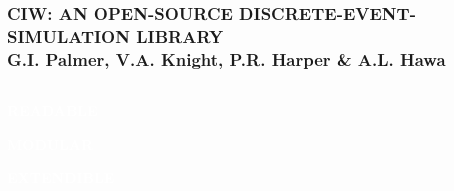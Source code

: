 \documentclass{beamer}
\begin{document}
\begin{frame}
\frametitle{\textcolor{textgrey}{CIW: AN OPEN-SOURCE DISCRETE-EVENT- SIMULATION LIBRARY}\\\small{\textcolor{textorange}{G.I. Palmer, V.A. Knight, P.R. Harper \& A.L. Hawa}}}
\begin{columns}
  \begin{column}{0.4\textwidth}
        \begin{tcolorbox}[boxrule=10pt, colback=ciwyellow,colframe=ciwyellow]
        \textcolor{white}{\large{\textbf{READABLE}}}
        \end{tcolorbox}
        \begin{tcolorbox}[boxrule=10pt, colback=mplblue,colframe=mplblue]
        \textcolor{white}{\large{\textbf{MODULAR}}}
        \end{tcolorbox}
        \begin{tcolorbox}[boxrule=10pt, colback=textorange,colframe=textorange]
        \textcolor{white}{\large{\textbf{EXTENDIBLE}}}
        \end{tcolorbox}
  \end{column}
  \begin{column}{0.6\textwidth}
  
  \end{column}
\end{columns}
\end{frame}
\end{document}
